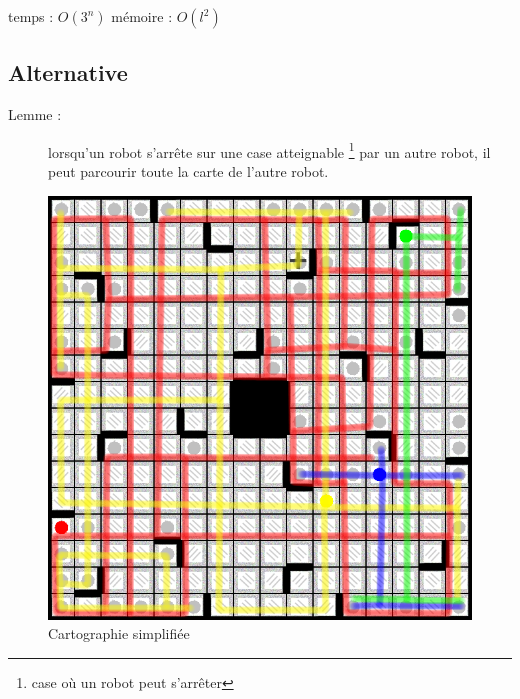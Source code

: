 \documentclass{beamer}
\begin{document}
\begin{frame}
  \vfill
  \begin{center}
    temps : $O(3^n)$
    \vfill
    m\'emoire : $O(l^2)$
  \end{center}
  \vfill
\end{frame}

\subsection{Alternative}

\begin{frame}
  \vfill
  \vfill
\end{frame}

\begin{frame}
 \begin{description}
  \item[Lemme : ] lorsqu'un robot s'arrête sur une case atteignable \footnote{case où un robot peut s'arrêter} par un autre robot, il peut parcourir toute la carte de l'autre robot.
 \end{description}
\end{frame}

\begin{frame}
  \begin{figure}[htbp]
    \centering
    \includegraphics[width=.7\linewidth]{img/chemins_initiaux.png}
    \caption{Cartographie simplifi\'ee}
  \end{figure}
\end{frame}
\end{document}
